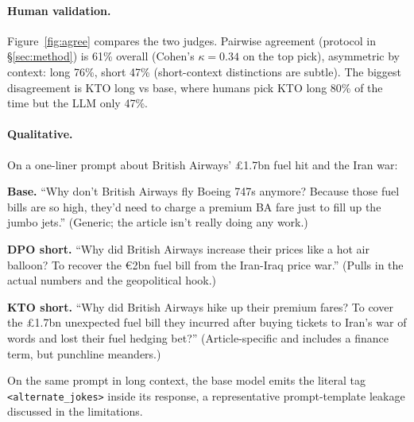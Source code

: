 \paragraph{Human validation.}
\label{sec:humanval}
Figure~\ref{fig:agree} compares the two judges.  Pairwise agreement (protocol in \S\ref{sec:method}) is 61\% overall (Cohen's $\kappa = 0.34$ on the top pick), asymmetric by context: long 76\%, short 47\% (short-context distinctions are subtle).  The biggest disagreement is KTO long vs base, where humans pick KTO long 80\% of the time but the LLM only 47\%.

\paragraph{Qualitative.}
On a one-liner prompt about British Airways' £1.7bn fuel hit and the Iran war:

\noindent\textbf{Base.}  ``Why don't British Airways fly Boeing 747s anymore? Because those fuel bills are so high, they'd need to charge a premium BA fare just to fill up the jumbo jets.''  (Generic; the article isn't really doing any work.)

\noindent\textbf{DPO short.}  ``Why did British Airways increase their prices like a hot air balloon? To recover the €2bn fuel bill from the Iran-Iraq price war.''  (Pulls in the actual numbers and the geopolitical hook.)

\noindent\textbf{KTO short.}  ``Why did British Airways hike up their premium fares? To cover the £1.7bn unexpected fuel bill they incurred after buying tickets to Iran's war of words and lost their fuel hedging bet?''  (Article-specific and includes a finance term, but punchline meanders.)

On the same prompt in long context, the base model emits the literal tag \verb|<alternate_jokes>| inside its response, a representative prompt-template leakage discussed in the limitations.

